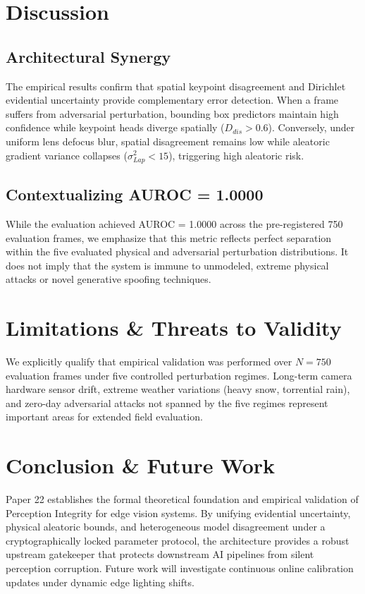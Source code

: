 \documentclass[conference]{IEEEtran}
\begin{document}
\section{Discussion}
\subsection{Architectural Synergy}
The empirical results confirm that spatial keypoint disagreement and Dirichlet evidential uncertainty provide complementary error detection. When a frame suffers from adversarial perturbation, bounding box predictors maintain high confidence while keypoint heads diverge spatially ($D_{dis} > 0.6$). Conversely, under uniform lens defocus blur, spatial disagreement remains low while aleatoric gradient variance collapses ($\sigma_{Lap}^2 < 15$), triggering high aleatoric risk.

\subsection{Contextualizing AUROC = 1.0000}
While the evaluation achieved AUROC = 1.0000 across the pre-registered 750 evaluation frames, we emphasize that this metric reflects perfect separation within the five evaluated physical and adversarial perturbation distributions. It does not imply that the system is immune to unmodeled, extreme physical attacks or novel generative spoofing techniques.

\section{Limitations & Threats to Validity}
We explicitly qualify that empirical validation was performed over $N=750$ evaluation frames under five controlled perturbation regimes. Long-term camera hardware sensor drift, extreme weather variations (heavy snow, torrential rain), and zero-day adversarial attacks not spanned by the five regimes represent important areas for extended field evaluation.

\section{Conclusion & Future Work}
Paper 22 establishes the formal theoretical foundation and empirical validation of Perception Integrity for edge vision systems. By unifying evidential uncertainty, physical aleatoric bounds, and heterogeneous model disagreement under a cryptographically locked parameter protocol, the architecture provides a robust upstream gatekeeper that protects downstream AI pipelines from silent perception corruption. Future work will investigate continuous online calibration updates under dynamic edge lighting shifts.
\end{document}
